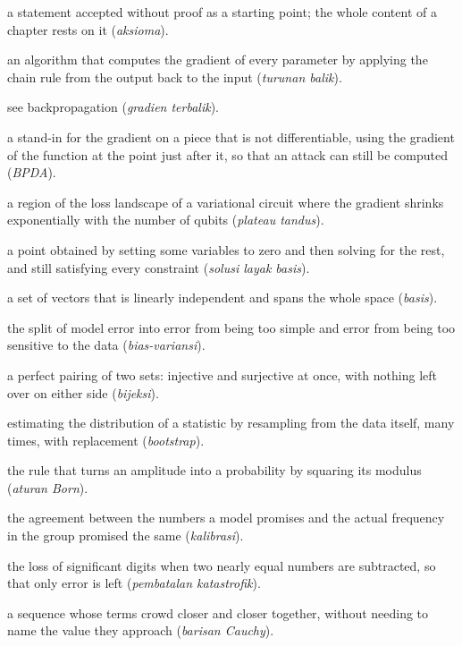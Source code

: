 \begin{description}[style=nextline,itemsep=0.35em]
  \item[Axiom] a statement accepted without proof as a starting point; the whole content of a chapter rests on it (\emph{aksioma}).
  \item[Backpropagation] an algorithm that computes the gradient of every parameter by applying the chain rule from the output back to the input (\emph{turunan balik}).
  \item[Backward gradient] see backpropagation (\emph{gradien terbalik}).
  \item[Backward pass differentiable approximation] a stand-in for the gradient on a piece that is not differentiable, using the gradient of the function at the point just after it, so that an attack can still be computed (\emph{BPDA}).
  \item[Barren plateau] a region of the loss landscape of a variational circuit where the gradient shrinks exponentially with the number of qubits (\emph{plateau tandus}).
  \item[Basic feasible solution] a point obtained by setting some variables to zero and then solving for the rest, and still satisfying every constraint (\emph{solusi layak basis}).
  \item[Basis] a set of vectors that is linearly independent and spans the whole space (\emph{basis}).
  \item[Bias-variance tradeoff] the split of model error into error from being too simple and error from being too sensitive to the data (\emph{bias-variansi}).
  \item[Bijection] a perfect pairing of two sets: injective and surjective at once, with nothing left over on either side (\emph{bijeksi}).
  \item[Bootstrap] estimating the distribution of a statistic by resampling from the data itself, many times, with replacement (\emph{bootstrap}).
  \item[Born rule] the rule that turns an amplitude into a probability by squaring its modulus (\emph{aturan Born}).
  \item[Calibration] the agreement between the numbers a model promises and the actual frequency in the group promised the same (\emph{kalibrasi}).
  \item[Catastrophic cancellation] the loss of significant digits when two nearly equal numbers are subtracted, so that only error is left (\emph{pembatalan katastrofik}).
  \item[Cauchy sequence] a sequence whose terms crowd closer and closer together, without needing to name the value they approach (\emph{barisan Cauchy}).

\end{description}
